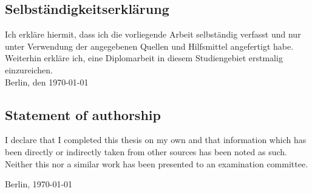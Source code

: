 \appendix
\thispagestyle{empty}
{\parindent 0cm      
\subsection*{Selbst\"andigkeitserkl\"arung}   
  Ich erkl\"are hiermit, dass ich die vorliegende Arbeit selbst\"andig verfasst    und nur unter Verwendung der angegebenen Quellen und Hilfsmittel angefertigt habe.    Weiterhin erkl\"are ich, eine Diplomarbeit in diesem Studiengebiet erstmalig einzureichen.\\ 

\vspace{3\baselineskip}      Berlin, den \today \hspace{0.25\linewidth}\parbox{0.3\linewidth}{\dotfill}
\subsection*{Statement of authorship} 
  I declare that I completed this thesis on my own and that information which has been  directly or indirectly taken from other sources has been noted as such. Neither this  nor a similar work has been presented to an examination committee.

  \vspace{3\baselineskip} Berlin, \today
  \hspace{0.25\linewidth}\parbox{0.3\linewidth}{\dotfill} 
}